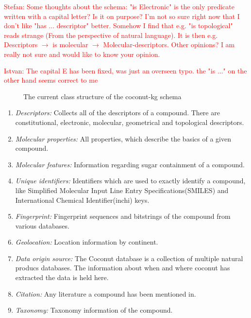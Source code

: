 \documentclass[
]{ceurart}
\begin{document}

\textcolor{red}{Stefan: Some thoughts about the schema: "is Electronic" is the only predicate written with a capital letter? Is it on purpose? I'm not so sure right now that I don't like "has ... descriptor" better. Somehow I find that e.g. "is topological" reads strange (From the perspective of natural language). It is then e.g. Descriptors $\longrightarrow$ is molecular $\longrightarrow$ Molecular-descriptors. Other opinions? I am really not sure and would like to know your opinion.}

\textcolor{red}{Istvan: The capital E has been fixed, was just an overseen typo. the "is ..." on the other hand seems correct to me}
\begin{figure}[ht]
    \centering
    
    \caption{The current class structure of the coconut-kg schema}
    \label{fig:classes_coco}
\end{figure}

\begin{enumerate}[label=\emph{\alph*})]

\item \textit{Descriptors:} Collects all of the descriptors of a compound. There are constitutional, electronic, molecular, geometrical and topological descriptors.

\item \textit{Molecular properties:} All properties, which describe the basics of a given compound.

\item \textit{Molecular features:} Information regarding sugar containment of a compound.

\item \textit{Unique identifiers:} Identifiers which are used to exactly identify a compound, like Simplified Molecular Input Line Entry Specifications(SMILES) and International Chemical Identifier(inchi) keys.

\item \textit{Fingerprint:} Fingerprint sequences and bitstrings of the compound from various databases.

\item \textit{Geolocation:} Location information by continent.

\item \textit{Data origin source:} The Coconut database is a collection of multiple natural producs databases. The information about when and where coconut has extracted the data is held here.

\item \textit{Citation:} Any literature a compound has been mentioned in.

\item \textit{Taxonomy:} Taxonomy information of the compound.

\end{enumerate}
\end{document}
